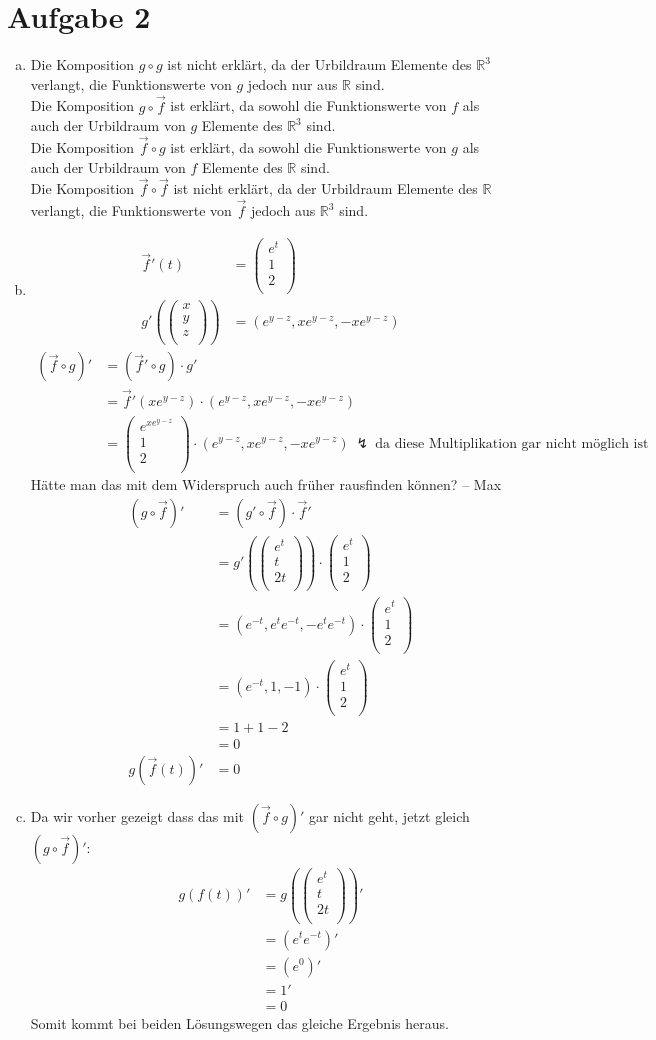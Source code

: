 \documentclass[10pt,a4paper,parskip=half]{scrartcl}
\newcommand{\R}{\mathbb{R}}
\newcommand{\vecthree}[3]{\begin{pmatrix}#1\\#2\\#3\\\end {pmatrix}}
\begin{document}
\section*{Aufgabe 2}
\begin{enumerate}[(a)]
\item
Die Komposition $g \circ g$ ist nicht erklärt, da der Urbildraum Elemente des $\mathbb{\R}^3$ verlangt, die Funktionswerte von $g$ jedoch nur aus $\mathbb{\R}$ sind.\\
Die Komposition $g \circ \vec f$ ist erklärt, da sowohl die Funktionswerte von $f$ als auch der Urbildraum von $g$ Elemente des $\mathbb{\R}^3$ sind.\\
Die Komposition $\vec f \circ g$ ist erklärt, da sowohl die Funktionswerte von $g$ als auch der Urbildraum von $f$ Elemente des $\mathbb{\R}$ sind.\\
Die Komposition $\vec f \circ \vec f$ ist nicht erklärt, da der Urbildraum Elemente des $\mathbb{\R}$ verlangt, die Funktionswerte von $\vec f$ jedoch aus $\mathbb{\R}^3$ sind.\item
\begin{align*}
\vec f'(t) &= \vecthree{e^t}{1}{2} \\
g'(\vecthree{x}{y}{z}) &= \left(e^{y-z}, xe^{y-z}, -xe^{y-z}\right)
\end{align*}
\begin{align*} 
(\vec f \circ g)' &= (\vec f' \circ g) \cdot g' \\
&= \vec f'(xe^{y-z}) \cdot \left(e^{y-z}, xe^{y-z}, -xe^{y-z}\right) \\
&= \vecthree{e^{xe^{y-z}}}{1}{2} \cdot \left(e^{y-z}, xe^{y-z}, -xe^{y-z}\right) \ \lightning\ \text{da diese Multiplikation gar nicht möglich ist}
\end{align*}
Hätte man das mit dem Widerspruch auch früher rausfinden können? -- Max
\begin{align*} 
(g \circ \vec f)' &= (g' \circ \vec f) \cdot \vec f' \\
&= g'(\vecthree{e^t}{t}{2t}) \cdot \vecthree{e^t}{1}{2} \\
&= \left(e^{-t}, e^te^{-t}, -e^te^{-t}\right) \cdot \vecthree{e^t}{1}{2} \\
&= \left(e^{-t}, 1, -1\right) \cdot \vecthree{e^t}{1}{2} \\
&= 1 + 1 - 2\\
&= 0\\
g(\vec f(t))' &= 0
\end{align*}
\item
Da wir vorher gezeigt dass das mit $(\vec f \circ g)'$ gar nicht geht, jetzt gleich $(g \circ \vec f)'$:
\begin{align*}
g(f(t))' &= g(\vecthree{e^t}{t}{2t})' \\
&= (e^te^{-t})' \\
&= (e^0)' \\
&= 1' \\
&= 0
\end{align*}
Somit kommt bei beiden Lösungswegen das gleiche Ergebnis heraus.
\end{enumerate}
\end{document}

